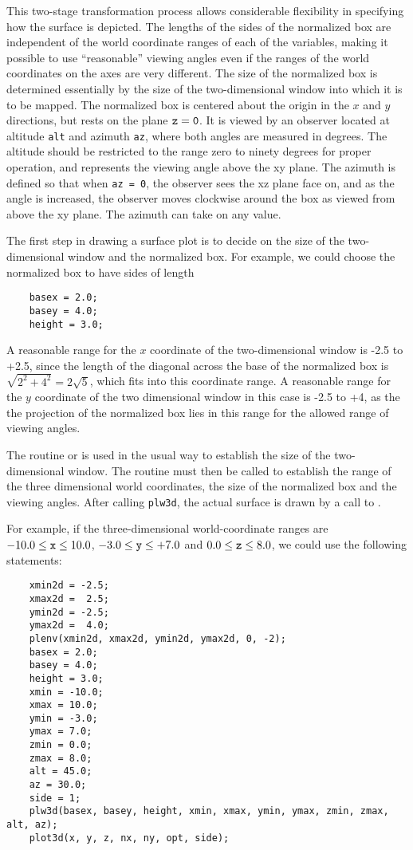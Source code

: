 This two-stage transformation process allows considerable flexibility in
specifying how the surface is depicted. The lengths of the sides of the
normalized box are independent of the world coordinate ranges of each of the
variables, making it possible to use ``reasonable'' viewing angles even if the
ranges of the world coordinates on the axes are very different. The size of the
normalized box is determined essentially by the size of the two-dimensional
window into which it is to be mapped. The normalized box is centered about the
origin in the $x$ and $y$ directions, but rests on the plane ${\tt z = 0}$. It is
viewed by an observer located at altitude {\tt alt} and azimuth {\tt az}, where
both angles are measured in degrees. The altitude should be restricted to the
range zero to ninety degrees for proper operation, and represents the viewing
angle above the xy plane. The azimuth is defined so that when {\tt az = 0}, the
observer sees the xz plane face on, and as the angle is increased, the observer
moves clockwise around the box as viewed from above the xy plane. The azimuth
can take on any value.

The first step in drawing a surface plot is to decide on the size of the
two-dimensional window and the normalized box. For example, we could choose
the normalized box to have sides of length
\begin{verbatim}
    basex = 2.0;
    basey = 4.0;
    height = 3.0;
\end{verbatim}
A reasonable range for the $x$ coordinate of the two-dimensional
window is -2.5 to +2.5, since the length of the diagonal across the base of
the normalized box is $\sqrt{2^2+4^2} = 2\sqrt{5}$, which fits into this
coordinate range. A reasonable range for the $y$ coordinate of the two
dimensional window in this case is -2.5 to +4, as the the projection of the
normalized box lies in this range for the allowed range of viewing angles.

The routine  or  is used in the usual way
to establish the size of the two-dimensional window. The routine
 must then be called to establish the range of the three
dimensional world coordinates, the size of the normalized box and the
viewing angles. After calling {\tt plw3d}, the actual surface is
drawn by a call to .

For example, if the three-dimensional world-coordinate ranges are
$-10.0\le{\tt x}\le 10.0$, $-3.0\le{\tt y}\le +7.0$ and
$0.0\le{\tt z}\le 8.0$, we could use the following statements:
\begin{verbatim}
    xmin2d = -2.5;
    xmax2d =  2.5;
    ymin2d = -2.5;
    ymax2d =  4.0;
    plenv(xmin2d, xmax2d, ymin2d, ymax2d, 0, -2);
    basex = 2.0;
    basey = 4.0;
    height = 3.0;
    xmin = -10.0;
    xmax = 10.0;
    ymin = -3.0;
    ymax = 7.0;
    zmin = 0.0;
    zmax = 8.0;
    alt = 45.0;
    az = 30.0;
    side = 1;
    plw3d(basex, basey, height, xmin, xmax, ymin, ymax, zmin, zmax, alt, az);
    plot3d(x, y, z, nx, ny, opt, side);
\end{verbatim}

